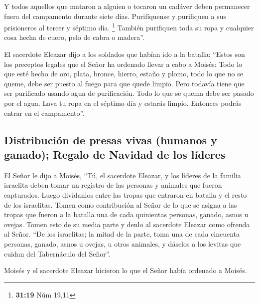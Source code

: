  Y todos aquellos que mataron a alguien o tocaron un
cadáver deben permanecer fuera del campamento durante siete días.
Purifíquense y purifiquen a sus prisioneros al tercer y séptimo día.
\footnote{\textbf{31:19} Núm 19,11}  También purifiquen
toda su ropa y cualquier cosa hecha de cuero, pelo de cabra o madera''.

 El sacerdote Eleazar dijo a los soldados que habían ido
a la batalla: ``Estos son los preceptos legales que el Señor ha ordenado
llevar a cabo a Moisés:  Todo lo que esté hecho de oro,
plata, bronce, hierro, estaño y plomo,  todo lo que no se
queme, debe ser puesto al fuego para que quede limpio. Pero todavía
tiene que ser purificado usando agua de purificación. Todo lo que se
quema debe ser pasado por el agua.  Lava tu ropa en el
séptimo día y estarás limpio. Entonces podrás entrar en el campamento''.

\hypertarget{distribuciuxf3n-de-presas-vivas-humanos-y-ganado-regalo-de-navidad-de-los-luxedderes}{%
\subsection{Distribución de presas vivas (humanos y ganado); Regalo de
Navidad de los
líderes}\label{distribuciuxf3n-de-presas-vivas-humanos-y-ganado-regalo-de-navidad-de-los-luxedderes}}

 El Señor le dijo a Moisés,  ``Tú, el
sacerdote Eleazar, y los líderes de la familia israelita deben tomar un
registro de las personas y animales que fueron capturados.
 Luego divídanlos entre las tropas que entraron en
batalla y el resto de los israelitas.  Tomen como
contribución al Señor de lo que se asigna a las tropas que fueron a la
batalla una de cada quinientas personas, ganado, asnos u ovejas.
 Tomen esto de su media parte y denlo al sacerdote
Eleazar como ofrenda al Señor.  ``De los israelitas; la
mitad de la parte, toma una de cada cincuenta personas, ganado, asnos u
ovejas, u otros animales, y dáselos a los levitas que cuidan del
Tabernáculo del Señor''.

 Moisés y el sacerdote Eleazar hicieron lo que el Señor
había ordenado a Moisés.

